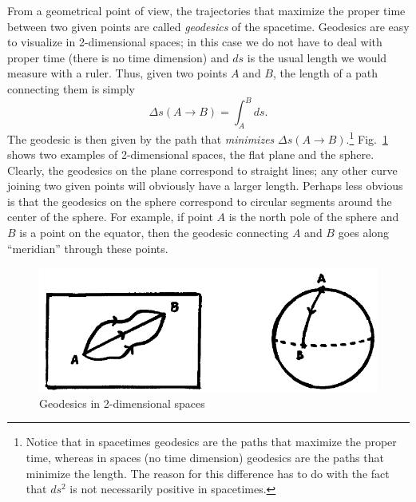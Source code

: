 \documentclass[11pt, a4paper,oneside,openright]{book}
\numberwithin{equation}{section}
\begin{document}
From a geometrical point of view, the trajectories that maximize the proper time between two given points are called {\it geodesics} of the spacetime. Geodesics are easy to visualize in 2-dimensional spaces; in this case we do not have to deal with proper time (there is no time dimension) and $ds$ is the usual length we would measure with a ruler. Thus, given two points $A$ and $B$, the length of a path connecting them is simply
\begin{equation}
\Delta s(A\to B)=\int_A^B ds.
\end{equation}
The geodesic is then given by the path that {\it minimizes} $\Delta s(A\to B)$.\footnote{Notice that in spacetimes geodesics are the paths that maximize the proper time, whereas in spaces (no time dimension) geodesics are the paths that minimize the length. The reason for this difference has to do with the fact that $ds^2$ is not necessarily positive in spacetimes.} Fig.\ \ref{fig:lec4_1} shows two examples of 2-dimensional spaces, the flat plane and the sphere. Clearly, the geodesics on the plane correspond to straight lines; any other curve joining two given points will obviously have a larger length. Perhaps less obvious is that the geodesics on the sphere correspond to circular segments around the center of the sphere. For example, if point $A$ is the north pole of the sphere and $B$ is a point on the equator, then the geodesic connecting $A$ and $B$ goes along ``meridian'' through these points.
\begin{figure}[ht]
\begin{center}
\includegraphics[scale=0.5]{Draw/lec4_1.png}
\end{center}
\caption{Geodesics in 2-dimensional spaces}
\label{fig:lec4_1}
\end{figure}
\end{document}
